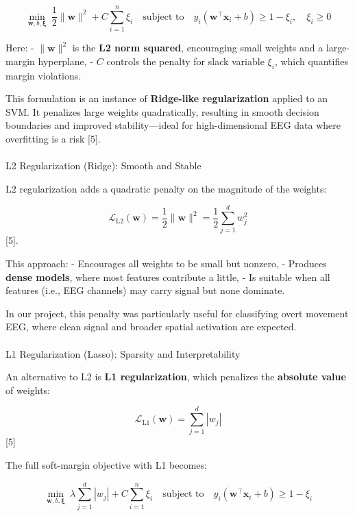 \documentclass[
  letterpaper,
  DIV=11,
  numbers=noendperiod]{scrartcl}
\makeatletter
\let\oldparagraph\paragraph
\renewcommand{\paragraph}{
    \@ifstar
      \xxxParagraphStar
      \xxxParagraphNoStar
  }
\newcommand{\xxxParagraphStar}[1]{\oldparagraph*{#1}\mbox{}}
\newcommand{\xxxParagraphNoStar}[1]{\oldparagraph{#1}\mbox{}}
\makeatother
\begin{document}
\[
\min_{\mathbf{w}, b, \boldsymbol{\xi}} \ \frac{1}{2} \|\mathbf{w}\|^2 + C \sum_{i=1}^{n} \xi_i
\quad \text{subject to} \quad
y_i (\mathbf{w}^\top \mathbf{x}_i + b) \geq 1 - \xi_i, \quad \xi_i \geq 0
\]

Here: - \(\|\mathbf{w}\|^2\) is the \textbf{L2 norm squared},
encouraging small weights and a large-margin hyperplane, - \(C\)
controls the penalty for slack variable \(\xi_i\), which quantifies
margin violations.

This formulation is an instance of \textbf{Ridge-like regularization}
applied to an SVM. It penalizes large weights quadratically, resulting
in smooth decision boundaries and improved stability---ideal for
high-dimensional EEG data where overfitting is a risk {[}5{]}.

\paragraph{L2 Regularization (Ridge): Smooth and
Stable}\label{l2-regularization-ridge-smooth-and-stable}

L2 regularization adds a quadratic penalty on the magnitude of the
weights:

\[
\mathcal{L}_{\text{L2}}(\mathbf{w}) = \frac{1}{2} \|\mathbf{w}\|^2 = \frac{1}{2} \sum_{j=1}^{d} w_j^2
\] {[}5{]}.

This approach: - Encourages all weights to be small but nonzero, -
Produces \textbf{dense models}, where most features contribute a little,
- Is suitable when all features (i.e., EEG channels) may carry signal
but none dominate.

In our project, this penalty was particularly useful for classifying
overt movement EEG, where clean signal and broader spatial activation
are expected.

\paragraph{L1 Regularization (Lasso): Sparsity and
Interpretability}\label{l1-regularization-lasso-sparsity-and-interpretability}

An alternative to L2 is \textbf{L1 regularization}, which penalizes the
\textbf{absolute value} of weights:

\[
\mathcal{L}_{\text{L1}}(\mathbf{w}) = \sum_{j=1}^{d} |w_j|
\] {[}5{]}

The full soft-margin objective with L1 becomes:

\[
\min_{\mathbf{w}, b, \boldsymbol{\xi}} \ \lambda \sum_{j=1}^{d} |w_j| + C \sum_{i=1}^{n} \xi_i
\quad \text{subject to} \quad
y_i (\mathbf{w}^\top \mathbf{x}_i + b) \geq 1 - \xi_i
\]
\end{document}

